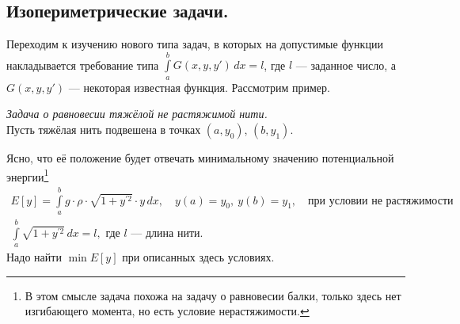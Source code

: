 \chapter{}
\label{lecture4}
\section{Изопериметрические задачи.}
\label{lecture4section1}
Переходим к изучению нового типа задач, в которых на допустимые функции накладывается требование типа $\int\limits_a^b G(x,y,y')\,dx=l$, где $l$ --- заданное число, а $G(x,y,y')$ --- некоторая известная функция. Рассмотрим пример.

\noindent\emph{Задача о равновесии тяжёлой не растяжимой нити.}\\
Пусть тяжёлая нить подвешена в точках $(a,y_0)$, $(b,y_1)$.



Ясно, что её положение будет отвечать минимальному значению потенциальной энергии\footnote[1]{В этом смысле задача похожа на задачу о равновесии балки, только здесь нет изгибающего момента, но есть условие нерастяжимости.}
\begin{gather*}
	E[y]=\int\limits_a^b g\cdot\rho\cdot\sqrt{1+y^{\prime2}}\cdot y\,dx,\quad y(a)=y_0,\ y(b)=y_1,\quad\text{при условии не растяжимости}\\
	\int\limits_a^b\sqrt{1+y^{\prime2}}\,dx=l,\text{ где $l$ --- длина нити.}
\end{gather*}	
Надо найти $\min E[y]$ при описанных здесь условиях.

